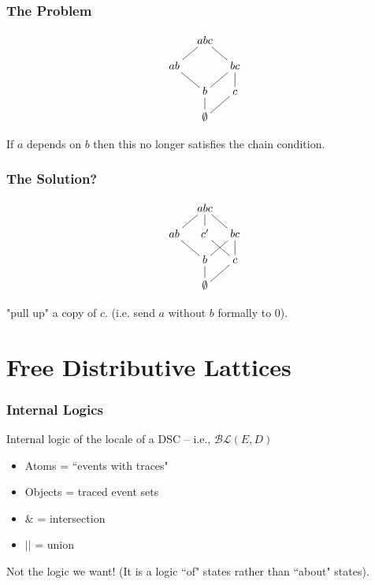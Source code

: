 \documentclass{beamer}
\newcommand{\BLc}{\mathcal{BL}}
\begin{document}
\begin{frame}
\frametitle{The Problem}

\begin{figure}
\begin{equation*}
    \xymatrix@=1em{& abc \ar@{-}[dl]  \ar@{-}[dr] & \\
      ab  \ar@{-}[dr] &   &
        bc \ar@{-}[d] \ar@{-}[dl] \\
       & b \ar@{-}[d] & c \ar@{-}[dl] \\
       & \emptyset &}
\end{equation*}
\end{figure}

If \(a\) depends on \(b\) then this no longer satisfies the chain condition.

\end{frame}

\begin{frame}
\frametitle{The Solution?}

\begin{figure}
\begin{equation*}
    \xymatrix@=1em{& abc \ar@{-}[dl] \ar@{-}[d] \ar@{-}[dr] & \\
      ab  \ar@{-}[dr] & c' \ar@{-}[dr]  &
        bc \ar@{-}[d] \ar@{-}[dl] \\
       & b \ar@{-}[d] & c \ar@{-}[dl] \\
       & \emptyset &}
\end{equation*}
\end{figure}

"pull up" a copy of \(c\). (i.e. send \(a\) without \(b\) formally to 0).

\end{frame}


\section{Free Distributive Lattices}
\begin{frame}
\frametitle{Internal Logics}
Internal logic of the locale of a DSC  -- i.e., \(\BLc(E,D)\)
\begin{itemize}
\item Atoms = ``events with traces"
\item Objects = traced event sets
\item \(\&\) = intersection
\item \(||\) = union
\end{itemize}

Not the logic we want! (It is a logic ``of" states rather than ``about" states).
\end{frame}
\end{document}
